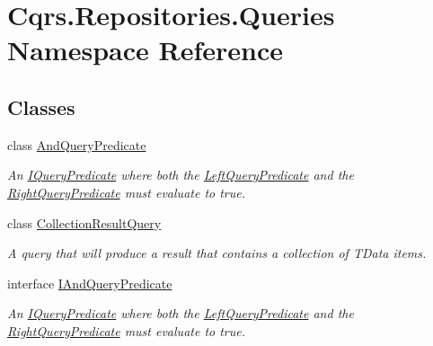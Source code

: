 \hypertarget{namespaceCqrs_1_1Repositories_1_1Queries}{}\section{Cqrs.\+Repositories.\+Queries Namespace Reference}
\label{namespaceCqrs_1_1Repositories_1_1Queries}
\subsection*{Classes}
\begin{DoxyCompactItemize}
\item 
class \hyperlink{classCqrs_1_1Repositories_1_1Queries_1_1AndQueryPredicate}{And\+Query\+Predicate}
\begin{DoxyCompactList}\small\item\em An \hyperlink{interfaceCqrs_1_1Repositories_1_1Queries_1_1IQueryPredicate}{I\+Query\+Predicate} where both the \hyperlink{classCqrs_1_1Repositories_1_1Queries_1_1AndQueryPredicate_ae083f7e251a564554bdb00b111226f18_ae083f7e251a564554bdb00b111226f18}{Left\+Query\+Predicate} and the \hyperlink{classCqrs_1_1Repositories_1_1Queries_1_1AndQueryPredicate_aa55816927e363ba4e7e313ad30ac2c2e_aa55816927e363ba4e7e313ad30ac2c2e}{Right\+Query\+Predicate} must evaluate to true. \end{DoxyCompactList}\item 
class \hyperlink{classCqrs_1_1Repositories_1_1Queries_1_1CollectionResultQuery}{Collection\+Result\+Query}
\begin{DoxyCompactList}\small\item\em A query that will produce a result that contains a collection of {\itshape T\+Data}  items. \end{DoxyCompactList}\item 
interface \hyperlink{interfaceCqrs_1_1Repositories_1_1Queries_1_1IAndQueryPredicate}{I\+And\+Query\+Predicate}
\begin{DoxyCompactList}\small\item\em An \hyperlink{interfaceCqrs_1_1Repositories_1_1Queries_1_1IQueryPredicate}{I\+Query\+Predicate} where both the \hyperlink{interfaceCqrs_1_1Repositories_1_1Queries_1_1IAndQueryPredicate_a35166ddeebe86048dba2e7f03407aa94_a35166ddeebe86048dba2e7f03407aa94}{Left\+Query\+Predicate} and the \hyperlink{interfaceCqrs_1_1Repositories_1_1Queries_1_1IAndQueryPredicate_ab24faa4c3423f91a8d9115b2cae6684b_ab24faa4c3423f91a8d9115b2cae6684b}{Right\+Query\+Predicate} must evaluate to true. \end{DoxyCompactList}\item 

\end{DoxyCompactItemize}
